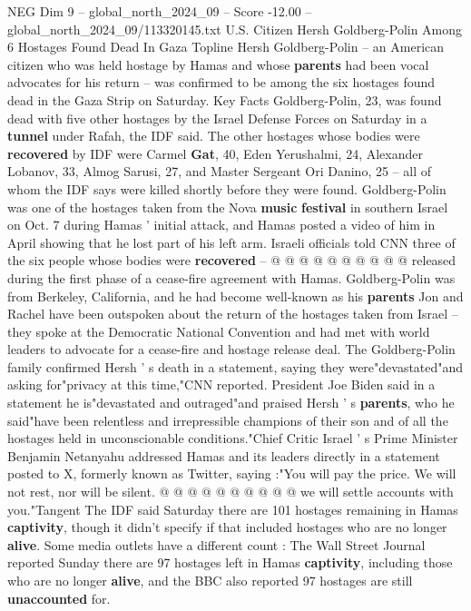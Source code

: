 \begin{textsample}{NEG Dim 9 – global\_north\_2024\_09 – Score -12.00 – global\_north\_2024\_09/113320145.txt}  \label{ex:f9_neg_007}
U.S.
Citizen Hersh Goldberg-Polin Among 6 Hostages Found Dead In Gaza Topline Hersh Goldberg-Polin -- an American citizen who was held hostage by Hamas and whose \textbf{parents} had been vocal advocates for his return -- was confirmed to be among the six hostages found dead in the Gaza Strip on Saturday.
Key Facts Goldberg-Polin, 23, was found dead with five other hostages by the Israel Defense Forces on Saturday in a \textbf{tunnel} under Rafah, the IDF said.
The other hostages whose bodies were \textbf{recovered} by IDF were Carmel \textbf{Gat}, 40, Eden Yerushalmi, 24, Alexander Lobanov, 33, Almog Sarusi, 27, and Master Sergeant Ori Danino, 25 -- all of whom the IDF says were killed shortly before they were found.
Goldberg-Polin was one of the hostages taken from the Nova \textbf{music} \textbf{festival} in southern Israel on Oct. 7 during Hamas ' initial attack, and Hamas posted a video of him in April showing that he lost part of his left arm.
Israeli officials told CNN three of the six people whose bodies were \textbf{recovered} -- @ @ @ @ @ @ @ @ @ @ released during the first phase of a cease-fire agreement with Hamas.
Goldberg-Polin was from Berkeley, California, and he had become well-known as his \textbf{parents} Jon and Rachel have been outspoken about the return of the hostages taken from Israel -- they spoke at the Democratic National Convention and had met with world leaders to advocate for a cease-fire and hostage release deal.
The Goldberg-Polin family confirmed Hersh ' s death in a statement, saying they were"devastated"and asking for"privacy at this time,"CNN reported.
President Joe Biden said in a statement he is"devastated and outraged"and praised Hersh ' s \textbf{parents}, who he said"have been relentless and irrepressible champions of their son and of all the hostages held in unconscionable conditions."Chief Critic Israel ' s Prime Minister Benjamin Netanyahu addressed Hamas and its leaders directly in a statement posted to X, formerly known as Twitter, saying :"You will pay the price.
We will not rest, nor will be silent. @ @ @ @ @ @ @ @ @ @ we will settle accounts with you."Tangent The IDF said Saturday there are 101 hostages remaining in Hamas \textbf{captivity}, though it didn't specify if that included hostages who are no longer \textbf{alive}.
Some media outlets have a different count : The Wall Street Journal reported Sunday there are 97 hostages left in Hamas \textbf{captivity}, including those who are no longer \textbf{alive}, and the BBC also reported 97 hostages are still \textbf{unaccounted} for.

\end{textsample}
